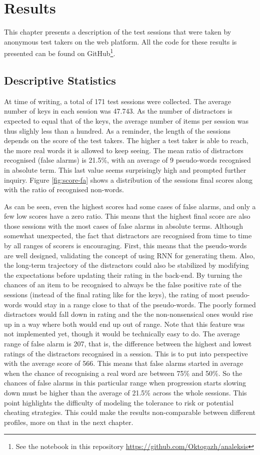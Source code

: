 ﻿\chapter{Results}
This chapter presents a description of the test sessions that were taken by anonymous test takers on the web platform. All the code for these results is presented can be found on GitHub\footnote{See the notebook in this repository \url{https://github.com/Oktogazh/analeksis}}. 

\section{Descriptive Statistics}
At time of writing, a total of 171 test sessions were collected. The average number of keys in each session was 47.743. As the number of distractors is expected to equal that of the keys, the average number of items per session was thus slighly less than a hundred. As a reminder, the length of the sessions depends on the score of the test takers. The higher a test taker is able to reach, the more real words it is allowed to keep seeing. The mean ratio of distractors recognised (false alarms) is 21.5\%, with an average of 9 pseudo-words recognised in absolute term. This last value seems surprisingly high and prompted further inquiry. Figure \ref{fig:score-fa} shows a distribution of the sessions final scores along with the ratio of recognised non-words.

As can be seen, even the highest scores had some cases of false alarms, and only a few low scores have a zero ratio. This means that the highest final score are also those sessions with the most cases of false alarms in absolute terms. Although somewhat unexpected, the fact that distractors are recognised from time to time by all ranges of scorers is encouraging. First, this means that the pseudo-words are well designed, validating the concept of using RNN for generating them. Also, the long-term trajectory of the distractors could also be stabilized by modifying the expectations before updating their rating in the back-end. By turning the chances of an item to be recognised to always be the false positive rate of the sessions (instead of the final rating like for the keys), the rating of most pseudo-words would stay in a range close to that of the pseudo-words. The poorly formed distractors would fall down in rating and the the non-nonsensical ones would rise up in a way where both would end up out of range. Note that this feature was not implemented yet, though it would be technically easy to do. The average range of false alarm is 207, that is, the difference between the highest and lowest ratings of the distractors recognised in a session. This is to put into perspective with the average score of 566. This means that false alarms started in average when the chance of recognising a real word are between 75\% and 50\%. So the chances of false alarms in this particular range when progression starts slowing down must be higher than the average of 21.5\% across the whole sessions. This point highlights the difficulty of modeling the tolerance to risk or potential cheating strategies. This could make the results non-comparable between different profiles, more on that in the next chapter.

